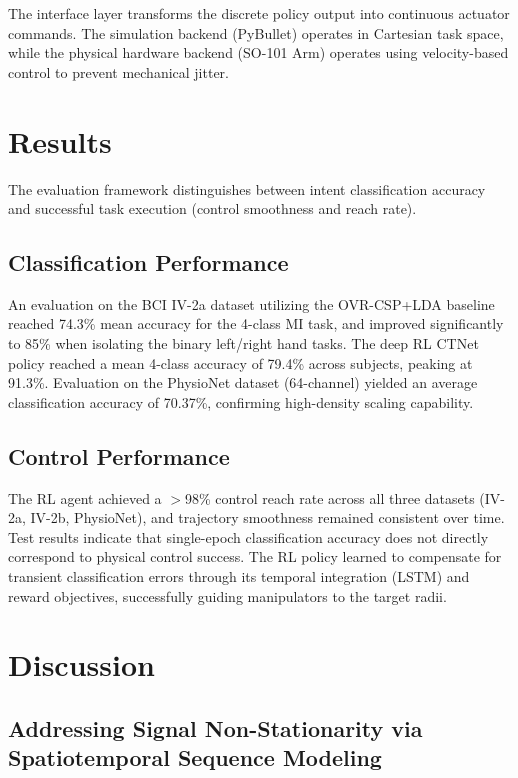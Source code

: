 \documentclass[12pt, a4paper]{article}
\begin{document}
The interface layer transforms the discrete policy output into continuous actuator commands. The simulation backend (PyBullet) operates in Cartesian task space, while the physical hardware backend (SO-101 Arm) operates using velocity-based control to prevent mechanical jitter.

\section{Results}

The evaluation framework distinguishes between intent classification accuracy and successful task execution (control smoothness and reach rate).

\subsection{Classification Performance}
An evaluation on the BCI IV-2a dataset utilizing the OVR-CSP+LDA baseline reached 74.3\% mean accuracy for the 4-class MI task, and improved significantly to 85\% when isolating the binary left/right hand tasks. The deep RL CTNet policy reached a mean 4-class accuracy of 79.4\% across subjects, peaking at 91.3\%. Evaluation on the PhysioNet dataset (64-channel) yielded an average classification accuracy of 70.37\%, confirming high-density scaling capability.

\subsection{Control Performance}
The RL agent achieved a $>$98\% control reach rate across all three datasets (IV-2a, IV-2b, PhysioNet), and trajectory smoothness remained consistent over time. Test results indicate that single-epoch classification accuracy does not directly correspond to physical control success. The RL policy learned to compensate for transient classification errors through its temporal integration (LSTM) and reward objectives, successfully guiding manipulators to the target radii.

\section{Discussion}

\subsection{Addressing Signal Non-Stationarity via Spatiotemporal Sequence Modeling}
\end{document}
